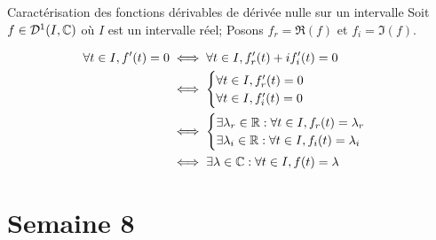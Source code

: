 \documentclass{article}
\renewenvironment{question_kholle}[2][ ]
{
	\subsection{\texorpdfstring{#2}{}}
	\notblank{#1}
	{
		\noindent #1
		\bigbreak
	}
	{}
	\begin{proof}
}
{
	\end{proof}
}
\begin{document}
\begin{question_kholle}{Caractérisation des fonctions dérivables de dérivée nulle sur un intervalle}
  Soit $f \in \mathcal D ^1 (I, \mathbb C)$ où $I$ est un intervalle réel;
  Posons $f_r = \Re (f)$ et $f_i = \Im(f)$.

  \begin{align*}
    \forall t \in I, f'(t) = 0 & \iff \forall t \in I, f_r'(t) + i f_i'(t) = 0                        \\
                               & \iff \begin{cases}
                                        \forall t \in I, f_r'(t) = 0 \\
                                        \forall t \in I, f_i'(t) = 0
                                      \end{cases}                                    \\
                               & \iff \begin{cases}
                                        \exists \lambda_r \in \mathbb R : \forall t \in I,  f_r(t) = \lambda_r \\
                                        \exists \lambda_i \in \mathbb R : \forall t \in I,  f_i(t) = \lambda_i
                                      \end{cases} \\
                               & \iff \exists \lambda \in \mathbb C : \forall t \in I,  f(t) = \lambda
  \end{align*}
\end{question_kholle}

\pagebreak\section{Semaine 8}
\end{document}
